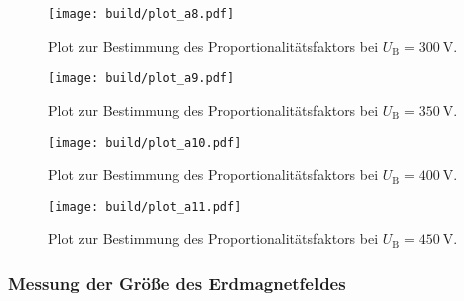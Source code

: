 \begin{figure}
  \centering
  \texttt{[image: build/plot\_a8.pdf]}
  \caption{Plot zur Bestimmung des Proportionalitätsfaktors bei $U_{\text{B}} = \SI{300}{\volt}$.}
  \label{plot:8}
\end{figure}

\begin{figure}
  \centering
  \texttt{[image: build/plot\_a9.pdf]}
  \caption{Plot zur Bestimmung des Proportionalitätsfaktors bei $U_{\text{B}} = \SI{350}{\volt}$.}
  \label{plot:9}
\end{figure}

\begin{figure}
  \centering
  \texttt{[image: build/plot\_a10.pdf]}
  \caption{Plot zur Bestimmung des Proportionalitätsfaktors bei $U_{\text{B}} = \SI{400}{\volt}$.}
  \label{plot:10}
\end{figure}

\begin{figure}
  \centering
  \texttt{[image: build/plot\_a11.pdf]}
  \caption{Plot zur Bestimmung des Proportionalitätsfaktors bei $U_{\text{B}} = \SI{450}{\volt}$.}
  \label{plot:11}
\end{figure}

\clearpage

\subsubsection{Messung der Größe des Erdmagnetfeldes}



